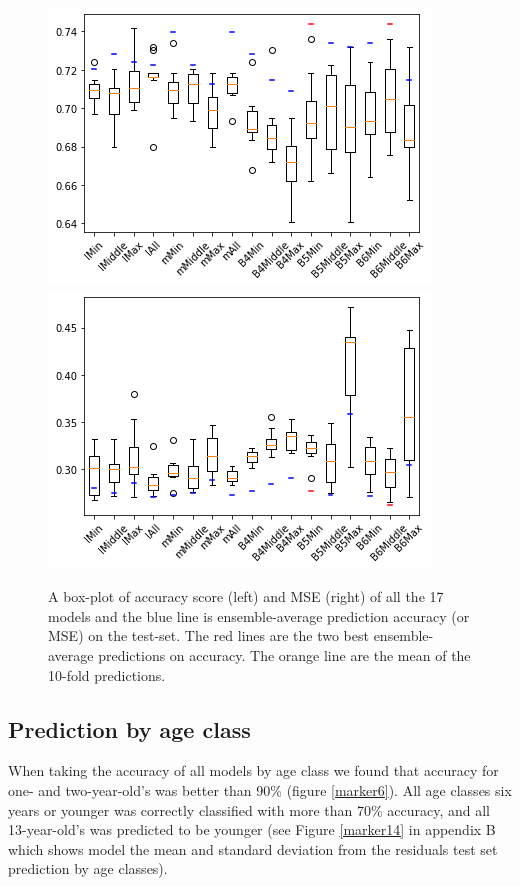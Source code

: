 \documentclass[10pt,letterpaper]{article}
\begin{document}
\begin{figure}[h!]
  \centering
  \begin{minipage}[b]{1.0\textwidth}
  \includegraphics[scale=0.47]{results/eda/box_plot_models_acc.png}
  \includegraphics[scale=0.47]{results/eda/box_plot_models_mse.png}
    \caption{A box-plot of accuracy score (left) and MSE (right) of all the 17 models 
    and the blue line is ensemble-average prediction accuracy (or MSE) on the test-set. 
    The red lines are the two best ensemble-average predictions on accuracy. 
    The orange line are the mean of the 10-fold predictions.}
   \label{marker5}
  \end{minipage}
  \hfill
\end{figure}

\subsection*{Prediction by age class}

When taking the accuracy of all models by age class we found that accuracy for one- and two-year-old's was better than 90\% (figure \ref{marker6}).
All age classes six years or younger was correctly classified with more than 70\% accuracy, and all 13-year-old's was predicted to be younger (see Figure \ref{marker14} in appendix B which shows model the mean and standard deviation from the residuals test set prediction by age classes).
\end{document}
